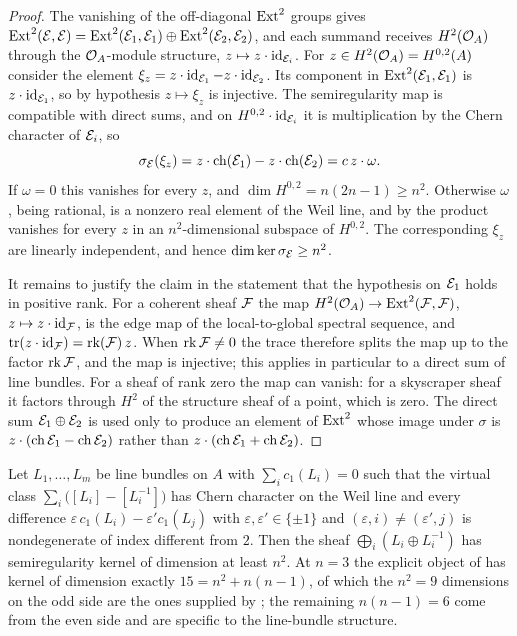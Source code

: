 \begin{proof}
The vanishing of the off-diagonal $\operatorname{Ext}^{2}$ groups gives
$\operatorname{Ext}^{2}(\mathcal{E},\mathcal{E})=\operatorname{Ext}^{2}(\mathcal{E}_{1},\mathcal{E}_{1})\oplus\operatorname{Ext}^{2}(\mathcal{E}_{2},\mathcal{E}_{2})$,
and each summand receives $H^{2}(\mathcal{O}_{A})$ through the $\mathcal{O}_{A}$-module
structure, $z\mapsto z\cdot\operatorname{id}_{\mathcal{E}_{i}}$. For $z\in H^{2}(\mathcal{O}_{A})=H^{0,2}(A)$
consider the element $\xi_{z}=z\cdot\operatorname{id}_{\mathcal{E}_{1}}-z\cdot\operatorname{id}_{\mathcal{E}_{2}}$. Its
component in $\operatorname{Ext}^{2}(\mathcal{E}_{1},\mathcal{E}_{1})$ is $z\cdot\operatorname{id}_{\mathcal{E}_{1}}$, so by
hypothesis $z\mapsto\xi_{z}$ is injective. The semiregularity map is
compatible with direct sums, and on $H^{0,2}\cdot\operatorname{id}_{\mathcal{E}_{i}}$ it is
multiplication by the Chern character of $\mathcal{E}_{i}$, so
\[
  \sigma_{\mathcal{E}}(\xi_{z})=z\cdot\operatorname{ch}(\mathcal{E}_{1})-z\cdot\operatorname{ch}(\mathcal{E}_{2})
  =c\,z\cdot\omega .
\]
If $\omega=0$ this vanishes for every $z$, and
$\dim H^{0,2}=n(2n-1)\ge n^{2}$. Otherwise $\omega$, being rational, is a
nonzero real element of the Weil line, and by  the
product vanishes for every $z$ in an $n^{2}$-dimensional subspace of
$H^{0,2}$. The corresponding $\xi_{z}$ are linearly independent, and hence
$\dim\ker\sigma_{\mathcal{E}}\ge n^{2}$.

It remains to justify the claim in the statement that the hypothesis on
$\mathcal{E}_{1}$ holds in positive rank. For a coherent sheaf $\mathcal{F}$ the map
$H^{2}(\mathcal{O}_{A})\to\operatorname{Ext}^{2}(\mathcal{F},\mathcal{F})$, $z\mapsto z\cdot\operatorname{id}_{\mathcal{F}}$, is the edge
map of the local-to-global spectral sequence, and
$\operatorname{tr}(z\cdot\operatorname{id}_{\mathcal{F}})=\operatorname{rk}(\mathcal{F})\,z$. When $\operatorname{rk}\mathcal{F}\ne0$ the trace
therefore splits the map up to the factor $\operatorname{rk}\mathcal{F}$, and the map is
injective; this applies in particular to a direct sum of line bundles. For a
sheaf of rank zero the map can vanish: for a skyscraper sheaf it factors
through $H^{2}$ of the structure sheaf of a point, which is zero. The direct
sum $\mathcal{E}_{1}\oplus\mathcal{E}_{2}$ is used only to produce an element of $\operatorname{Ext}^{2}$
whose image under $\sigma$ is $z\cdot(\operatorname{ch}\mathcal{E}_{1}-\operatorname{ch}\mathcal{E}_{2})$ rather than
$z\cdot(\operatorname{ch}\mathcal{E}_{1}+\operatorname{ch}\mathcal{E}_{2})$.
\end{proof}

\begin{corollary}
\label{cor:pteobstructed}
Let $L_{1},\dots,L_{m}$ be line bundles on $A$ with
$\sum_{i}c_{1}(L_{i})=0$ such that the virtual class
$\sum_{i}\bigl([L_{i}]-[L_{i}^{-1}]\bigr)$ has Chern character on the Weil
line and every difference
$\varepsilon\,c_{1}(L_{i})-\varepsilon'c_{1}(L_{j})$ with
$\varepsilon,\varepsilon'\in\{\pm1\}$ and $(\varepsilon,i)\ne(\varepsilon',j)$
is nondegenerate of index different from $2$. Then the sheaf
$\bigoplus_{i}(L_{i}\oplus L_{i}^{-1})$ has semiregularity kernel of
dimension at least $n^{2}$. At $n=3$ the explicit object of
 has kernel of dimension exactly
$15=n^{2}+n(n-1)$, of which the $n^{2}=9$ dimensions on the odd side are
the ones supplied by ; the remaining $n(n-1)=6$ come from
the even side and are specific to the line-bundle structure.
\end{corollary}

